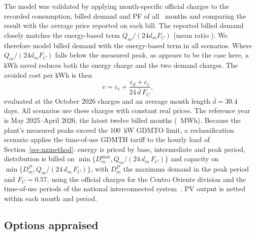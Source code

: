 \documentclass[preprint,12pt,authoryear]{elsarticle}
\begin{document}
The model was validated by applying month-specific official charges to the recorded consumption, billed demand and PF of all \nNMonths\ months and comparing the result with the average price reported on each bill. The reported billed demand closely matches the energy-based term $Q_m/(24 d_m F_C)$ (mean ratio \nKWRatio). We therefore model billed demand with the energy-based term in all scenarios. Where $Q_m/(24 d_m F_C)$ falls below the measured peak, as appears to be the case here, a kWh saved reduces both the energy charge and the two demand charges. The avoided cost per kWh is then
\begin{equation}
v = c_e + \frac{c_d + c_c}{24\,\bar d\,F_C},
\label{eq:marginal}
\end{equation}
evaluated at the October 2026 charges and an average month length $\bar d = 30.4$ days. All scenarios use these charges with constant real prices. The reference year is May 2025--April 2026, the latest twelve billed months (\nRefMWh~MWh). Because the plant's measured peaks exceed the 100~kW GDMTO limit, a reclassification scenario applies the time-of-use GDMTH tariff to the hourly load of Section~\ref{sec:nzmethod}: energy is priced by base, intermediate and peak period, distribution is billed on $\min\{D^{\max}_m, Q_m/(24\,d_m\,F_C)\}$ and capacity on $\min\{D^{P}_m, Q_m/(24\,d_m\,F_C)\}$, with $D^{P}_m$ the maximum demand in the peak period and $F_C=0.57$, using the official charges for the Centro Oriente division and the time-of-use periods of the national interconnected system~\citep{cfe2026gdmth}. PV output is netted within each month and period.

\subsection{Options appraised}
\end{document}
